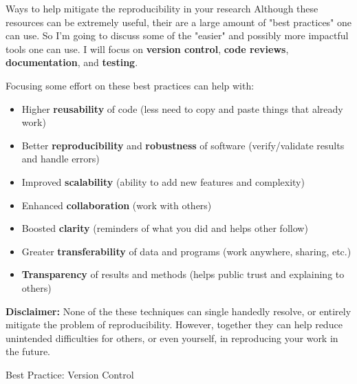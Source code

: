 \documentclass[final]{beamer}
\newlength{\colwidth}
\begin{document}
\begin{frame}[t]
\begin{columns}[t]
\begin{column}{\colwidth}
\begin{exampleblock}{Ways to help mitigate the reproducibility in your research}
    Although these resources can be extremely useful, their are a large amount
    of "best practices" one can use.
    So I'm going to discuss some of the "easier" and possibly more impactful
    tools one can use.
    I will focus on \textbf{version control}, \textbf{code reviews},
    \textbf{documentation}, and \textbf{testing}.
    
    Focusing some effort on these best practices can help with:
    \begin{itemize}
      \item Higher \textbf{reusability} of code (less need to copy and paste
        things that already work)
      \item Better \textbf{reproducibility} and \textbf{robustness} of software
        (verify/validate results and handle errors)
      \item Improved \textbf{scalability} (ability to add new features and
        complexity)
      \item Enhanced \textbf{collaboration} (work with others)
      \item Boosted \textbf{clarity} (reminders of what you did and helps other
        follow)
      \item Greater \textbf{transferability} of data and programs (work
        anywhere, sharing, etc.)
      \item \textbf{Transparency} of results and methods (helps public trust
        and explaining to others)
    \end{itemize}
    
    \textbf{Disclaimer:} None of the these techniques can single handedly
    resolve, or entirely mitigate the problem of reproducibility.
    However, together they can help reduce unintended difficulties for others,
    or even yourself, in reproducing your work in the future.

  \end{exampleblock}

  \begin{block}{Best Practice: Version Control}


\end{block}
\end{column}
\end{columns}
\end{frame}
\end{document}
